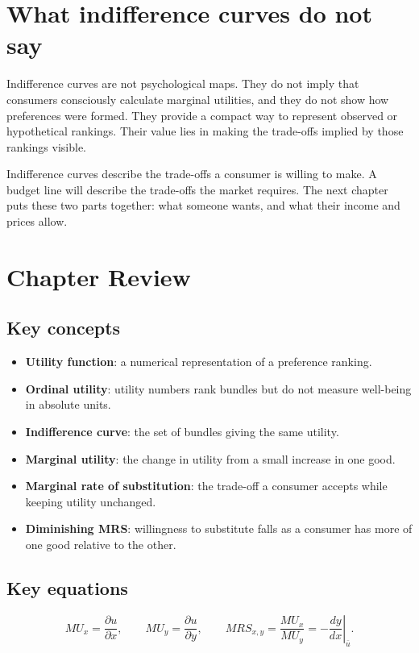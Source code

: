 \section{What indifference curves do not say}

Indifference curves are not psychological maps. They do not imply that
consumers consciously calculate marginal utilities, and they do not show how
preferences were formed. They provide a compact way to represent observed or
hypothetical rankings. Their value lies in making the trade-offs implied by
those rankings visible.

Indifference curves describe the trade-offs a consumer is willing to make. A
budget line will describe the trade-offs the market requires. The next chapter
puts these two parts together: what someone wants, and what their income and
prices allow.

\section*{Chapter Review}

\subsection*{Key concepts}
\begin{itemize}
  \item \textbf{Utility function}: a numerical representation of a preference ranking.
  \item \textbf{Ordinal utility}: utility numbers rank bundles but do not measure well-being in absolute units.
  \item \textbf{Indifference curve}: the set of bundles giving the same utility.
  \item \textbf{Marginal utility}: the change in utility from a small increase in one good.
  \item \textbf{Marginal rate of substitution}: the trade-off a consumer accepts while keeping utility unchanged.
  \item \textbf{Diminishing MRS}: willingness to substitute falls as a consumer has more of one good relative to the other.
\end{itemize}

\subsection*{Key equations}
\[
MU_x=\frac{\partial u}{\partial x}, \qquad
MU_y=\frac{\partial u}{\partial y}, \qquad
MRS_{x,y}=\frac{MU_x}{MU_y}
=-\left.\frac{dy}{dx}\right|_{\bar u}.
\]

